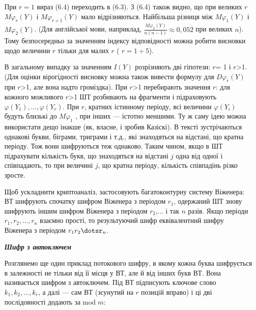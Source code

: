 При  ${r=1}$ вираз (6.4) переходить в (6.3). З (6.4) також видно, що при великих
 ${r}$  ${\mathit{M\varphi }_{{r}}(Y)}$ і  ${\mathit{M\varphi }_{{r+1}}(Y)}$
мало відрізняються. Найбільша різниця між  ${\mathit{M\varphi }_{{1}}(Y)}$ і 
${\mathit{M\varphi }_{{2}}(Y)}$. (Для англійської мови, наприклад, 
${\frac{\mathit{M\varphi }_{{2}}(Y)}{n(n-1)}\approx 0,\text{052}}$ при великих 
${n}$). Тому безпосередньо за значенням індексу відповідності можна робити
висновки щодо величини  ${r}$ тільки для малих  ${r}$ ( ${r=1\div 5}$). 

В загальному випадку за значенням  ${I(Y)}$ розрізняють дві гіпотези:  ${r}$= 1
і  ${r}${\textgreater}1. (Для оцінки вірогідності висновку можна також вивести
формулу для  ${\mathit{D\varphi }_{{r}}(Y)}$ при  ${r}${\textgreater}1, але
вона надто громіздка). При  ${r}${\textgreater}1 перебирають значення  ${r}$:
для кожного можливого  ${r}${\textgreater}1 ШТ розбивають на фрагменти і
підраховують  ${\varphi (Y_{{1}}),\dots,\varphi (Y_{{r}})}$.
При  ${r}$, кратних істинному періоду, всі величини  ${\varphi (Y_{{i}})}$
будуть близькі до  ${\mathit{M\varphi }_{{1}}}$ , при інших --- істотно меншими.
Ту ж саму ідею можна використати дещо інакше (як, власне, і зробив Казіскі). В
тексті зустрічаються однакові букви, біграми, триграми і т.д., які знаходяться
на відстані, що кратна періоду. Тож вони шифруються теж однаково. Таким чином,
якщо в ШТ підрахувати кількість букв, що знаходяться на відстані  ${j}$ одна
від одної і співпадають, то при величині  ${j}$, що кратна періоду, кількість
співпадінь різко зросте.

Щоб ускладнити криптоаналіз, застосовують багатоконтурну систему Віженера: ВТ
шифрують спочатку шифром Віженера з періодом  ${r_{{1}}}$, одержаний ШТ знову
шифрують іншим шифром Віженера з періодом  ${r_{{2}}}$,... і так  ${n}$ разів.
Якщо періоди  ${r_{{1}},r_{{2}},\dots,r_{{n}}}$ взаємно
прості, то результуючий шифр еквівалентний шифру Віженера з періодом 
${r_{{1}}r_{{2}}\dotsr_{{n}}}$. 


\bigskip


\bigskip

{\centering\bfseries\itshape
Шифр з автоключем
\par}


\bigskip


\bigskip

Розглянемо ще один приклад потокового шифру, в якому кожна буква шифрується в
залежності не тільки від її місця у ВТ, але й від інших букв ВТ. Вона
називається шифром з автоключем. Під ВТ підписують ключове слово 
${k_{{1}},k_{{2}},\dots,k_{{r}}}$, а далі --- сам ВТ (зсунутий
на  ${r}$ позицій вправо) і ці дві послідовності додають за  ${\text{mod}\;m}$:


